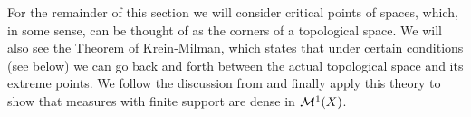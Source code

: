 %
%	
%	
%	




For the remainder of this section we will consider critical points of spaces, which, in some sense, can be thought of as the \glqq corners\grqq{} of a topological space. We will also see the Theorem of Krein-Milman, which states that under certain conditions (see below) we can go back and forth between the actual topological space and its extreme points. We follow the discussion from \cite{werner:funkana} and finally apply this theory to show that measures with finite support are dense in $\mathcal{M}^1(X)$.

